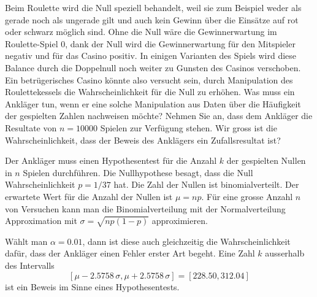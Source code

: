 Beim Roulette wird die Null speziell behandelt, weil sie zum Beispiel
weder als gerade noch als ungerade gilt und auch kein Gewinn über
die Einsätze auf rot oder schwarz möglich sind.
Ohne die Null wäre die Gewinnerwartung im Roulette-Spiel 0,
dank der Null wird die Gewinnerwartung für den Mitspieler negativ
und für das Casino positiv. 
In einigen Varianten des Spiels wird diese Balance durch die Doppelnull
noch weiter zu Gunsten des Casinos verschoben.
Ein betrügerisches Casino könnte also versucht sein, durch Manipulation
des Roulettekessels die Wahrscheinlichkeit für die Null zu erhöhen.
Was muss ein Ankläger tun, wenn er eine solche Manipulation
aus Daten über die Häufigkeit der gespielten Zahlen nachweisen möchte?
Nehmen Sie an, dass dem Ankläger die Resultate von $n=10000$ Spielen
zur Verfügung stehen.
Wir gross ist die Wahrscheinlichkeit, dass der Beweis des Anklägers
ein Zufallsresultat ist?

\begin{loesung}
Der Ankläger muss einen Hypothesentest für die Anzahl $k$ der gespielten
Nullen in $n$ Spielen durchführen.
Die Nullhypothese besagt, dass die Null Wahrscheinlichkeit $p=1/37$ hat.
Die Zahl der Nullen ist binomialverteilt.
Der erwartete Wert für die Anzahl der Nullen ist $\mu=np$.
Für eine grosse Anzahl $n$ von Versuchen kann man die Binomialverteilung
mit der Normalverteilung Approximation mit $\sigma = \sqrt{np(1-p)}$ 
approximieren.

Wählt man $\alpha=0.01$, dann ist diese auch gleichzeitig die
Wahrscheinlichkeit dafür, dass der Ankläger einen Fehler erster Art
begeht.
Eine Zahl $k$ ausserhalb des Intervalls
\[
[ \mu - 2.5758\,\sigma, \mu + 2.5758\,\sigma]
=
[228.50, 312.04]
\]
ist ein Beweis im Sinne eines Hypothesentests.
\end{loesung}


